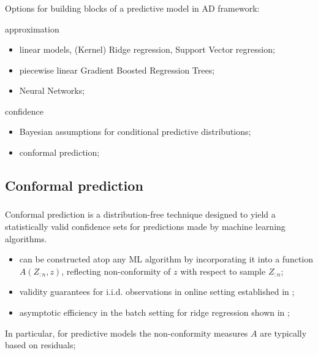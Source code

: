 \documentclass[t]{beamer}  %
\begin{document}
\begin{frame}[c]\frametitle{\insertsection}
  \framesubtitle{\insertsubsection}
  Options for building blocks of a predictive model in AD framework: 
  \begin{block}{approximation}
    \begin{itemize}
      \item linear models, (Kernel) Ridge regression, Support Vector regression;
      \item piecewise linear Gradient Boosted Regression Trees;
      \item Neural Networks;
    \end{itemize}
  \end{block}
  \begin{block}{confidence}
      \begin{itemize}
        \item Bayesian assumptions for conditional predictive distributions;
        \item conformal prediction;
      \end{itemize}
  \end{block}
\end{frame}


\subsection{Conformal prediction} %
\label{sub:conformal_prediction}

\begin{frame}
  \frametitle{\insertsection}
  \framesubtitle{\insertsubsection}
  Conformal prediction is a distribution-free technique designed to yield a statistically
  valid confidence sets for predictions made by machine learning algorithms.

  \begin{itemize}
    \item can be constructed atop any ML algorithm by incorporating it into a function
    $A(Z_{:n}, z)$, reflecting non-conformity of $z$ with respect to sample $Z_{:n}$;
    \item validity guarantees for i.i.d. observations in online setting established
    in \cite{vovk2005};
    \item asymptotic efficiency in the batch setting for ridge regression shown in
    \cite{burnaevV14};
  \end{itemize}

  In particular, for predictive models the non-conformity measures $A$ are typically
  based on residuals;
\end{frame}
\end{document}
